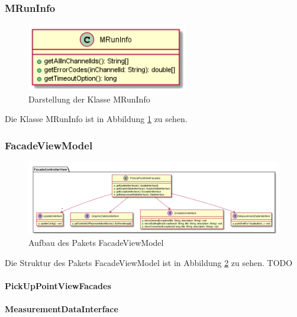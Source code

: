\documentclass[parskip=full]{scrartcl}
\begin{document}
\subsubsection{MRunInfo}

\begin{figure}[htbp]
	\begin{center}
		\includegraphics[width = 7cm]{Grafiken/MRunInfo.png}
		\caption{Darstellung der Klasse MRunInfo}
		\label{MRunInfo}
	\end{center}
\end{figure}

Die Klasse MRunInfo ist in Abbildung \ref{MRunInfo} zu sehen.





\subsubsection{FacadeViewModel}

\begin{figure}[htbp]
	\begin{center}
		\includegraphics[width = 16cm]{Grafiken/FacadeViewModel.png}
		\caption{Aufbau des Pakets FacadeViewModel}
		\label{FacadeViewModel}
	\end{center}
\end{figure}

Die Struktur des Pakets FacadeViewModel ist in Abbildung \ref{FacadeViewModel} zu sehen.
TODO

\paragraph{PickUpPointViewFacades}
\paragraph{MeasurementDataInterface}
\end{document}
